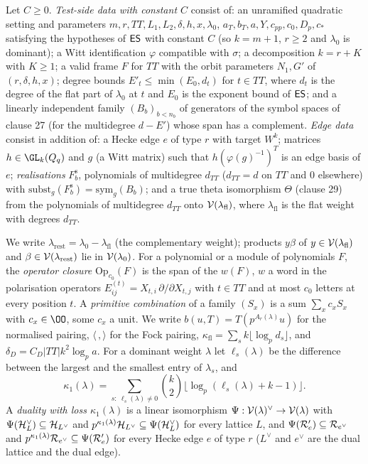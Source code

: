 \begin{definition}\label{pf:linkG:testdata}
Let $C\ge0$. \emph{Test-side data with constant $C$} consist of: an unramified quadratic setting and parameters
$m,r,TT,L_1,L_2,\delta,h,x,\lambda_0$, $a_T,b_T,a,Y,c_{pp},c_0,D_p,c_*$ satisfying the hypotheses of $\mathsf{ES}$ with
constant $C$ (so $k=m+1$, $r\ge2$ and $\lambda_0$ is dominant); a Witt identification $\varphi$ compatible with $\sigma$; a
decomposition $k=r+K$ with $K\ge1$; a valid frame $F$ for $TT$ with the orbit parameters $N_1,G'$ of $(r,\delta,h,x)$;
degree bounds $E'_t\le\min(E_0,d_t)$ for $t\in TT$, where $d_t$ is the degree of the flat part of $\lambda_0$ at $t$ and
$E_0$ is the exponent bound of $\mathsf{ES}$; and a linearly independent family $(B_b)_{b<n_b}$ of generators of the symbol
spaces of clause 27 (for the multidegree $d-E'$) whose span has a complement. \emph{Edge data} consist in addition of: a
Hecke edge $e$ of type $r$ with target $W^k$; matrices $h\in\GL_k(Q_q)$ and $g$ (a Witt matrix) such that
$h(\varphi(g)^{-1})^T$ is an edge basis of $e$; \emph{realisations} $F^{\mathrm s}_b$, polynomials of multidegree $d_{TT}$
($d_{TT}=d$ on $TT$ and $0$ elsewhere) with $\mathrm{subst}_g(F^{\mathrm s}_b)=\mathrm{sym}_g(B_b)$; and a true theta
isomorphism $\Theta$ (clause 29) from the polynomials of multidegree $d_{TT}$ onto $\mathcal V(\lambda_{\mathrm{fl}})$, where
$\lambda_{\mathrm{fl}}$ is the flat weight with degrees $d_{TT}$.
\end{definition}

We write $\lambda_{\mathrm{rest}}=\lambda_0-\lambda_{\mathrm{fl}}$ (the complementary weight); products $y\beta$ of
$y\in\mathcal V(\lambda_{\mathrm{fl}})$ and $\beta\in\mathcal V(\lambda_{\mathrm{rest}})$ lie in $\mathcal V(\lambda_0)$. For a polynomial
or a module of polynomials $F$, the \emph{operator closure} $\mathrm{Op}_{c_0}(F)$ is the span of the $w(F)$, $w$ a word in
the polarisation operators $E^{(t)}_{ij}=X_{t,i}\,\partial/\partial X_{t,j}$ with $t\in TT$ and at most $c_0$ letters at
every position $t$. A \emph{primitive combination} of a family $(S_x)$ is a sum $\sum_xc_xS_x$ with $c_x\in\OO$, some $c_x$
a unit. We write $b(u,T)=T(p^{A_r(\lambda)}u)$ for the normalised pairing, $\langle\,,\rangle$ for the Fock pairing,
$\kappa_{\mathrm{fl}}=\sum_sk\lfloor\log_pd_s\rfloor$, and $\delta_D=C_D|TT|k^2\log_pa$. For a dominant weight $\lambda$ let
$\ell_s(\lambda)$ be the difference between the largest and the smallest entry of $\lambda_s$, and
\[
\kappa_1(\lambda)=\sum_{s:\ \ell_s(\lambda)\ne0}\binom k2\bigl\lfloor\log_p(\ell_s(\lambda)+k-1)\bigr\rfloor .
\]
A \emph{duality with loss $\kappa_1(\lambda)$} is a linear isomorphism $\Psi:\mathcal V(\lambda)^\vee\to\mathcal V(\lambda)$ with
$\Psi(\mathcal H_L^\vee)\subseteq\mathcal H_{L^\vee}$ and $p^{\kappa_1(\lambda)}\mathcal H_{L^\vee}\subseteq\Psi(\mathcal H_L^\vee)$ for every
lattice $L$, and $\Psi(\mathcal R'_e)\subseteq\mathcal R_{e^\vee}$ and $p^{\kappa_1(\lambda)}\mathcal R_{e^\vee}\subseteq\Psi(\mathcal R'_e)$
for every Hecke edge $e$ of type $r$ ($L^\vee$ and $e^\vee$ are the dual lattice and the dual edge).

